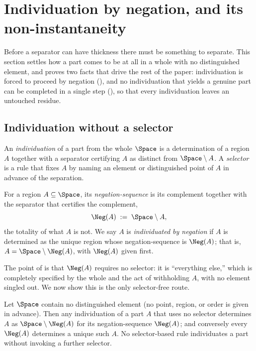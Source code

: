 
\section{Individuation by negation, and its non-instantaneity}
\label{sec:negation}

Before a separator can have thickness there must be something to separate. This
section settles how a part comes to be at all in a whole with no distinguished
element, and proves two facts that drive the rest of the paper: individuation is
forced to proceed by negation (), and no individuation
that yields a genuine part can be completed in a single step
(), so that every individuation leaves an untouched
residue.

\subsection{Individuation without a selector}

\begin{definition}[Individuation]
\label{def:individuation}
An \emph{individuation} of a part from the whole $\Space$ is a determination of a
region $A$ together with a separator certifying $A$ as distinct from
$\Space\setminus A$. A \emph{selector} is a rule that fixes $A$ by naming an
element or distinguished point of $A$ in advance of the separation.
\end{definition}

\begin{definition}
\label{def:negation}
For a region $A\subseteq\Space$, its \emph{negation-sequence} is its complement
together with the separator that certifies the complement,
\[
\Neg(A)\;:=\;\Space\setminus A,
\]
the totality of what $A$ is not. We say $A$ is \emph{individuated by negation}
if $A$ is determined as the unique region whose negation-sequence is $\Neg(A)$;
that is, $A=\Space\setminus\Neg(A)$, with $\Neg(A)$ given first.
\end{definition}

The point of  is that $\Neg(A)$ requires no selector: it is
``everything else,'' which is completely specified by the whole and the act of
withholding $A$, with no element singled out. We now show this is the only
selector-free route.

\begin{theorem}
\label{thm:negation-unique}
Let $\Space$ contain no distinguished element \textup{(}no point, region, or
order is given in advance\textup{)}. Then any individuation of a part $A$ that
uses no selector determines $A$ as $\Space\setminus\Neg(A)$ for its
negation-sequence $\Neg(A)$; and conversely every $\Neg(A)$ determines a unique
such $A$. No selector-based rule individuates a part without invoking a further
selector.
\end{theorem}

